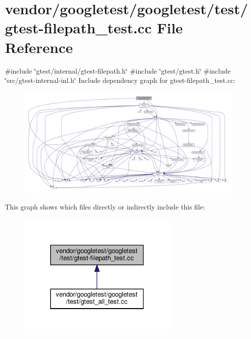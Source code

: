 \hypertarget{gtest-filepath__test_8cc}{}\section{vendor/googletest/googletest/test/gtest-\/filepath\+\_\+test.cc File Reference}
\label{gtest-filepath__test_8cc}
{\ttfamily \#include \char`\"{}gtest/internal/gtest-\/filepath.\+h\char`\"{}}\newline
{\ttfamily \#include \char`\"{}gtest/gtest.\+h\char`\"{}}\newline
{\ttfamily \#include \char`\"{}src/gtest-\/internal-\/inl.\+h\char`\"{}}\newline
Include dependency graph for gtest-\/filepath\+\_\+test.cc\+:
\nopagebreak
\begin{figure}[H]
\begin{center}
\leavevmode
\includegraphics[width=350pt]{gtest-filepath__test_8cc__incl}
\end{center}
\end{figure}
This graph shows which files directly or indirectly include this file\+:
\nopagebreak
\begin{figure}[H]
\begin{center}
\leavevmode
\includegraphics[width=222pt]{gtest-filepath__test_8cc__dep__incl}
\end{center}
\end{figure}
